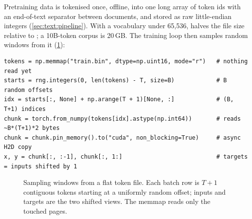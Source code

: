 Pretraining data is tokenised once, offline, into one long array of token ids with an
end-of-text separator between documents, and stored as raw little-endian integers
(\cref{sec:text:pipeline}). With a vocabulary under 65,536,  halves the file size
relative to ; a 10B-token corpus is 20\,GB. The training loop then samples random
windows from it (\cref{fig:optim:window}):

\begin{lstlisting}[caption={Random windows from a memory-mapped token file (\texttt{RandomWindowBatcher.\_\_next\_\_}).},label={lst:optim:batcher}]
tokens = np.memmap("train.bin", dtype=np.uint16, mode="r")   # nothing read yet
starts = rng.integers(0, len(tokens) - T, size=B)            # B random offsets
idx = starts[:, None] + np.arange(T + 1)[None, :]            # (B, T+1) indices
chunk = torch.from_numpy(tokens[idx].astype(np.int64))       # reads ~B*(T+1)*2 bytes
chunk = chunk.pin_memory().to("cuda", non_blocking=True)     # async H2D copy
x, y = chunk[:, :-1], chunk[:, 1:]                           # targets = inputs shifted by 1
\end{lstlisting}

\begin{figure}[t]
\centering
{}
\caption{Sampling windows from a flat token file. Each batch row is $T+1$ contiguous tokens
starting at a uniformly random offset; inputs and targets are the two shifted views. The memmap
reads only the touched pages.}
\label{fig:optim:window}
\end{figure}


